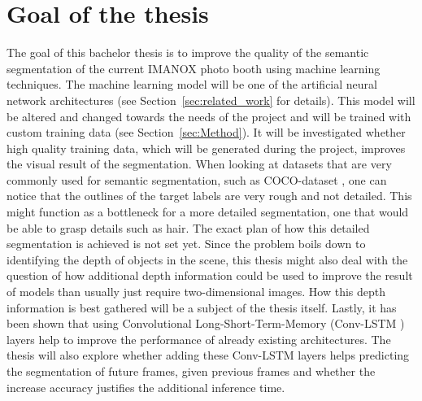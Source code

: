 \documentclass[11pt,
  paper=a4, 
  bibliography=totocnumbered,
	captions=tableheading,
	BCOR=10mm
]{scrreprt}
\theoremstyle{definition}
\begin{document}
\section{Goal of the thesis}
The goal of this bachelor thesis is to improve the quality of the semantic segmentation of the current IMANOX photo booth using machine learning techniques.
The machine learning model will be one of the artificial neural network architectures (see Section~\ref{sec:related_work} for details).
This model will be altered and changed towards the needs of the project and will be trained with custom training data (see Section~\ref{sec:Method}).
It will be investigated whether high quality training data, which will be generated during the project, improves the visual result of the segmentation.
When looking at datasets that are very commonly used for semantic segmentation, such as COCO-dataset \cite{COCO2016}, one can notice that the outlines of the target labels are very rough and not detailed.
This might function as a bottleneck for a more detailed segmentation, one that would be able to grasp details such as hair.
The exact plan of how this detailed segmentation is achieved is not set yet.
Since the problem boils down to identifying the depth of objects in the scene, this thesis might also deal with the question of how additional depth information could be used to improve the result of models than usually just require two-dimensional images.
How this depth information is best gathered will be a subject of the thesis itself.
Lastly, it has been shown \cite{Nabavi2018, Pfeuffer2019} that using Convolutional Long-Short-Term-Memory (Conv-LSTM \cite{Shi2015}) layers help to improve the performance of already existing architectures.
The thesis will also explore whether adding these Conv-LSTM layers helps predicting the segmentation of future frames, given previous frames and whether the increase accuracy justifies the additional inference time.
\end{document}

